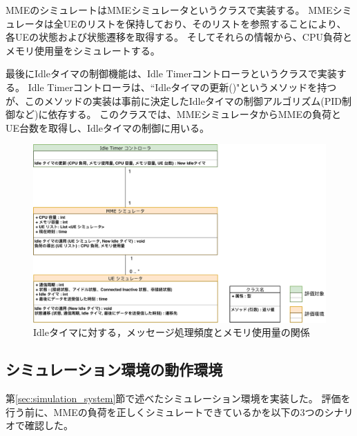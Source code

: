 \documentclass[a4j]{ujarticle}
\begin{document}
MMEのシミュレートはMMEシミュレータというクラスで実装する。
MMEシミュレータは全UEのリストを保持しており、そのリストを参照することにより、各UEの状態および状態遷移を取得する。
そしてそれらの情報から、CPU負荷とメモリ使用量をシミュレートする。

最後にIdleタイマの制御機能は、Idle Timerコントローラというクラスで実装する。
Idle Timerコントローラは、``Idleタイマの更新()"というメソッドを持つが、このメソッドの実装は事前に決定したIdleタイマの制御アルゴリズム(PID制御など)に依存する。
このクラスでは、MMEシミュレータからMMEの負荷とUE台数を取得し、Idleタイマの制御に用いる。

\begin{figure}[htbp]
  \centering
  \includegraphics[width=1.0\hsize]{Simulation_UML.pdf}
  \caption{Idleタイマに対する，メッセージ処理頻度とメモリ使用量の関係}
  \label{Simulation_UML}
\end{figure}
\clearpage


\subsection{シミュレーション環境の動作環境}
\label{sec:simulation_program}
第\ref{sec:simulation_system}節で述べたシミュレーション環境を実装した。
評価を行う前に、MMEの負荷を正しくシミュレートできているかを以下の3つのシナリオで確認した。
\end{document}

